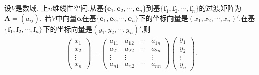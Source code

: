 \documentclass[lang=cn,newtx,10pt,scheme=chinese]{elegantbook}
\begin{document}
\begin{theorem}[同一向量在不同基下坐标向量的关系]\label{theorem:同一向量在不同基下坐标向量的关系}
设\(V\)是数域\(\mathbb{F}\)上\(n\)维线性空间,从基\(\{\boldsymbol{e}_1,\boldsymbol{e}_2,\cdots,\boldsymbol{e}_n\}\)到基\(\{\boldsymbol{f}_1,\boldsymbol{f}_2,\cdots,\boldsymbol{f}_n\}\)的过渡矩阵为\(\boldsymbol{A}=(a_{ij})\). 若\(V\)中向量\(\boldsymbol{\alpha}\)在基\(\{\boldsymbol{e}_1,\boldsymbol{e}_2,\cdots,\boldsymbol{e}_n\}\)下的坐标向量是\((x_1,x_2,\cdots,x_n)'\),在基\(\{\boldsymbol{f}_1,\boldsymbol{f}_2,\cdots,\boldsymbol{f}_n\}\)下的坐标向量是\((y_1,y_2,\cdots,y_n)'\),则
\begin{gather*}
\begin{pmatrix}
x_1\\
x_2\\
\vdots\\
x_n
\end{pmatrix}=\begin{pmatrix}
a_{11}&a_{12}&\cdots&a_{1n}\\
a_{21}&a_{22}&\cdots&a_{2n}\\
\vdots&\vdots&&\vdots\\
a_{n1}&a_{n2}&\cdots&a_{nn}
\end{pmatrix}\begin{pmatrix}
y_1\\
y_2\\
\vdots\\
y_n
\end{pmatrix}.
\end{gather*}
\end{theorem}
\end{document}
